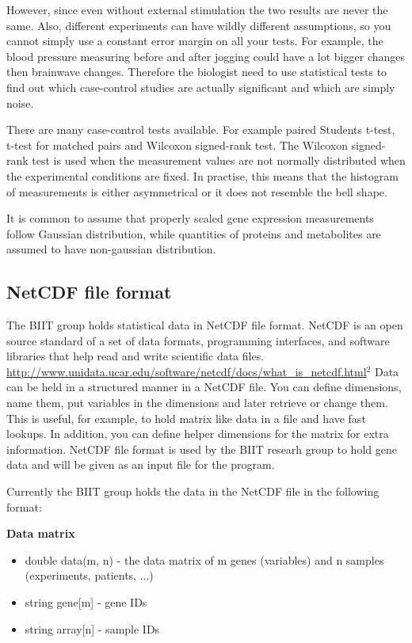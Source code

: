 \documentclass[12pt]{article}
\begin{document}
However, since even without external stimulation the two results are never the same. Also, different experiments can have wildly different assumptions, so you cannot simply use a constant error margin on all your tests. For example, the blood pressure measuring before and after jogging could have a lot bigger changes then brainwave changes.  Therefore  the biologist need to use statistical tests to find out which case-control studies are actually significant and which are simply noise.

There are many case-control tests available. For example paired Students t-test, t-test for matched pairs and Wilcoxon signed-rank test. The Wilcoxon signed-rank test is used when the measurement values are not normally distributed when the experimental conditions are fixed.  In practise, this means that the histogram of measurements is either asymmetrical or it does not resemble the bell shape.

It is common to assume that properly scaled gene expression measurements follow Gaussian distribution, while quantities of proteins and metabolites are assumed to have non-gaussian distribution.

\subsection{NetCDF file format}
The BIIT group holds statistical data in NetCDF file format. NetCDF is an open source standard of a set of data formats, programming interfaces, and software libraries that help read and write scientific data files. \url{http://www.unidata.ucar.edu/software/netcdf/docs/what_is_netcdf.html}$^2$
Data can be held in a structured manner in a NetCDF file. You can define dimensions, name them, put variables in the dimensions and later retrieve or change them. This is useful, for example, to hold matrix like data in a file and have fast lookups. In addition, you can define helper dimensions for the matrix for extra information.
NetCDF file format is used by the BIIT researh group to hold gene data and will be given as an input file for the program.

Currently the BIIT group holds the data in the NetCDF file in the following format:

\textbf{Data matrix}
\begin{itemize}
  \item double data(m, n) - the data matrix of m genes (variables) and n samples (experiments, patients, ...)
  \item string gene[m] - gene IDs
  \item string array[n] - sample IDs
\end{itemize}
\end{document}
